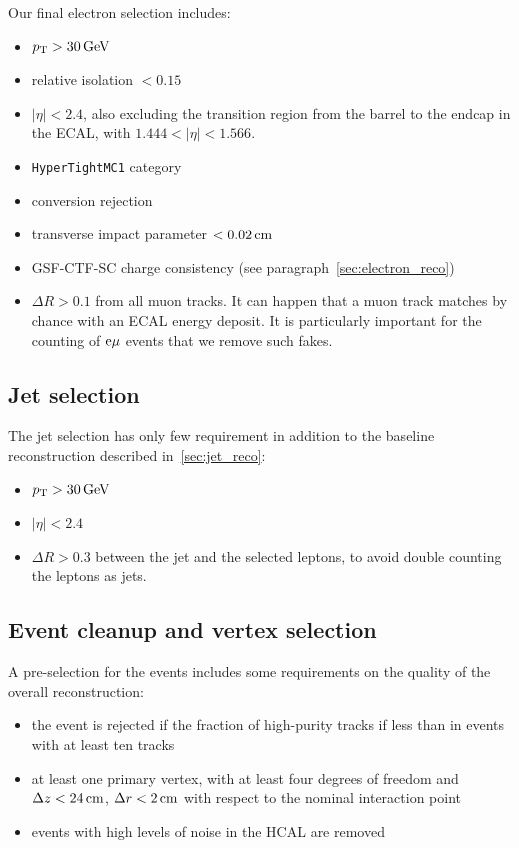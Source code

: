 Our final electron selection includes:
\begin{itemize}
    \item $\pt > \unit[30]{GeV}$
    \item relative isolation $< 0.15$
    \item $|\eta| < 2.4$, also excluding the transition region from the
        barrel to the endcap in the ECAL, with $1.444 < |\eta| < 1.566$.
    \item \texttt{HyperTightMC1} category
    \item conversion rejection
    \item transverse impact parameter $< \unit[0.02]{cm}$
    \item GSF-CTF-SC charge consistency (see
        paragraph~\ref{sec:electron_reco})
    \item $\Delta R > 0.1$ from all muon tracks. It can happen that a muon
        track matches by chance with an ECAL energy deposit. It is
        particularly important for the counting of $\mathrm{e} \mu$ events that we remove such fakes.
\end{itemize}

\subsection{Jet selection}
The jet selection has only few requirement in addition to the baseline
reconstruction described in~\ref{sec:jet_reco}:
\begin{itemize}
    \item $\pt > \unit[30]{GeV}$
    \item $|\eta| < 2.4$
    \item $\Delta R > 0.3$ between the jet and the selected leptons, to
        avoid double counting the leptons as jets.
\end{itemize}

\subsection{Event cleanup and vertex selection}
A pre-selection for the events includes some requirements on the quality of
the overall reconstruction:
\begin{itemize}
    \item the event is rejected if the fraction of high-purity tracks if
        less than  in events with at least ten tracks
    \item at least one primary vertex, with at least four degrees of freedom
        and $\Delta z < \unit[24]{cm}$, $\Delta r < \unit[2]{cm}$ with
        respect to the nominal interaction point
    \item events with high levels of noise in the HCAL are removed
\end{itemize}

